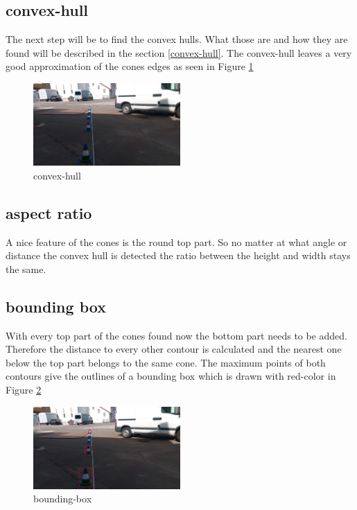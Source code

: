 \documentclass[10pt,a4paper]{article}
\begin{document}
	\subsection{convex-hull}
	The next step will be to find the convex hulls. What those are and how they are found will be described in the section \ref{convex-hull}. The convex-hull leaves a very good approximation of the cones edges as seen in Figure \ref{convex-hull-picture}
	\begin{figure}[h]
		\centering
		\includegraphics[width=0.5\textwidth]{Abb/convex-hull.png}
		\caption{convex-hull}
		\label{convex-hull-picture}
	\end{figure}
	
	\subsection{aspect ratio}
	A nice feature of the cones is the round top part. So no matter at what angle or distance the convex hull is detected the ratio between the height and width stays the same.
	
	\subsection{bounding box}
	With every top part of the cones found now the bottom part needs to be added. Therefore the distance to every other contour is calculated and the nearest one below the top part belongs to the same cone.
	The maximum points of both contours give the outlines of a bounding box which is drawn with red-color in Figure \ref{bounding-box}
	
	\begin{figure}[h]
		\centering
		\includegraphics[width=0.5\textwidth]{Abb/bounding-box.png}
		\caption{bounding-box}
		\label{bounding-box}
	\end{figure}
	
\end{document}
